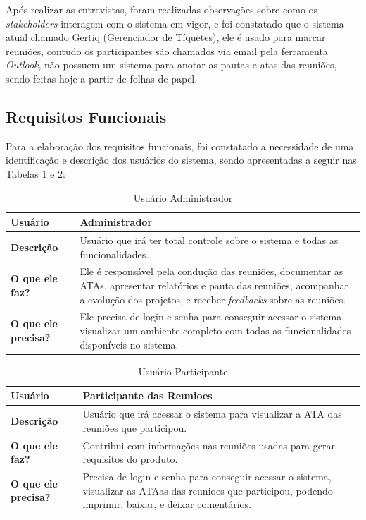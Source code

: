 Após realizar as entrevistas, foram realizadas observações sobre como os \textit{stakeholders} interagem com o sistema em vigor, e foi constatado que o sistema atual chamado Gertiq (Gerenciador de Tíquetes), ele é usado para marcar reuniões, contudo os participantes são chamados via email pela ferramenta \textit{Outlook}, não possuem um sistema para anotar as pautas e atas das reuniões, sendo feitas hoje a partir de folhas de papel.

\subsection{Requisitos Funcionais}

Para a elaboração dos requisitos funcionais, foi constatado a necessidade de uma identificação e descrição dos usuários do sistema, sendo apresentadas a seguir nas Tabelas \ref{tab:usuario_administrador} e \ref{tab:usuario_participante}: 

\begin{table}[H]
	\begin{tabular}{|p{3.0cm}|p{12.0cm}|} 
	\hline
	\textbf{Usuário} & \textbf{Administrador} \\ \hline
	\textbf{Descrição} & Usuário que irá ter total controle sobre o sistema e todas as funcionalidades.  \\ \hline
	\textbf{O que ele faz?} & Ele é responsável pela condução das reuniões, documentar as ATAs, apresentar relatórios e pauta das reuniões, acompanhar a evolução dos projetos, e receber \textit{feedbacks} sobre as reuniões. \\ \hline
	\textbf{O que ele precisa?} & Ele precisa de login e senha para conseguir acessar o sistema. visualizar um ambiente completo com todas as funcionalidades disponíveis no sistema. \\ \hline
	\end{tabular}
	 \caption{Usuário Administrador}
	 \label{tab:usuario_administrador}
\end{table}

\begin{table}[H]
	\begin{tabular}{|p{3.0cm}|p{12.0cm}|} 
	\hline
	\textbf{Usuário} & \textbf{Participante das Reunioes} \\ \hline
	\textbf{Descrição} & Usuário que irá acessar o sistema para visualizar a ATA das reuniões que participou. \\ \hline
	\textbf{O que ele faz?} & Contribui com informações nas reuniões usadas para gerar requisitos do produto. \\ \hline
	\textbf{O que ele precisa?} & Precisa de login e senha para conseguir acessar o sistema, visualizar as ATAas das reunioes que participou, podendo imprimir, baixar, e deixar comentários. \\ \hline
	\end{tabular}
	 \caption{Usuário Participante}
	 \label{tab:usuario_participante}
\end{table}

